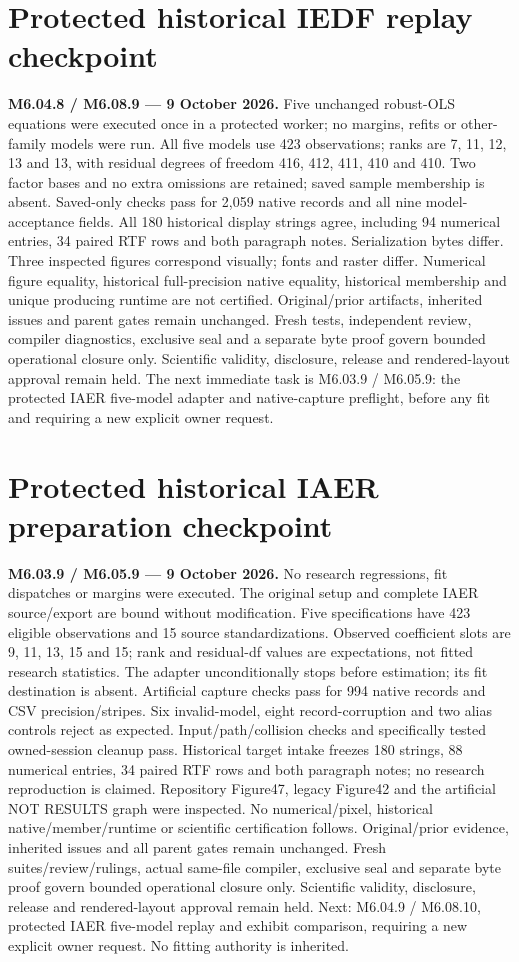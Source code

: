 \documentclass[11pt,a4paper]{article}
\begin{document}
\section*{Protected historical IEDF replay checkpoint}
\noindent\textbf{M6.04.8 / M6.08.9 --- 9 October 2026.}
Five unchanged robust-OLS equations were executed once in a protected worker;
no margins, refits or other-family models were run.
All five models use 423 observations; ranks are 7, 11, 12, 13 and 13,
with residual degrees of freedom 416, 412, 411, 410 and 410.
Two factor bases and no extra omissions are retained; saved sample membership is absent.
Saved-only checks pass for 2,059 native records and all nine model-acceptance fields.
All 180 historical display strings agree, including 94 numerical entries,
34 paired RTF rows and both paragraph notes. Serialization bytes differ.
Three inspected figures correspond visually; fonts and raster differ.
Numerical figure equality, historical full-precision native equality,
historical membership and unique producing runtime are not certified.
Original/prior artifacts, inherited issues and parent gates remain unchanged.
Fresh tests, independent review, compiler diagnostics, exclusive seal
and a separate byte proof govern bounded operational closure only.
Scientific validity, disclosure, release and rendered-layout approval remain held.
The next immediate task is M6.03.9 / M6.05.9:
the protected IAER five-model adapter and native-capture preflight,
before any fit and requiring a new explicit owner request.

\section*{Protected historical IAER preparation checkpoint}
\noindent\textbf{M6.03.9 / M6.05.9 --- 9 October 2026.}
No research regressions, fit dispatches or margins were executed.
The original setup and complete IAER source/export are bound without modification.
Five specifications have 423 eligible observations and 15 source standardizations.
Observed coefficient slots are 9, 11, 13, 15 and 15;
rank and residual-df values are expectations, not fitted research statistics.
The adapter unconditionally stops before estimation; its fit destination is absent.
Artificial capture checks pass for 994 native records and CSV precision/stripes.
Six invalid-model, eight record-corruption and two alias controls reject as expected.
Input/path/collision checks and specifically tested owned-session cleanup pass.
Historical target intake freezes 180 strings, 88 numerical entries,
34 paired RTF rows and both paragraph notes; no research reproduction is claimed.
Repository Figure47, legacy Figure42 and the artificial NOT RESULTS graph were inspected.
No numerical/pixel, historical native/member/runtime or scientific certification follows.
Original/prior evidence, inherited issues and all parent gates remain unchanged.
Fresh suites/review/rulings, actual same-file compiler, exclusive seal
and separate byte proof govern bounded operational closure only.
Scientific validity, disclosure, release and rendered-layout approval remain held.
Next: M6.04.9 / M6.08.10, protected IAER five-model replay and exhibit comparison,
requiring a new explicit owner request. No fitting authority is inherited.
\end{document}
